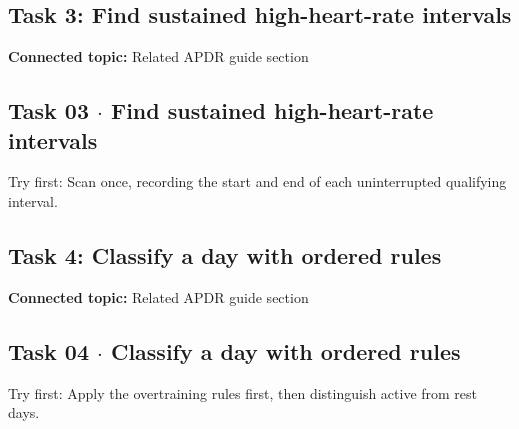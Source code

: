 \documentclass[11pt]{article}
\begin{document}
\begin{keepsection}
\section{Task 3: Find sustained high-heart-rate intervals}

\textbf{Connected topic:} Related APDR guide section

\begin{keepsection}
\subsection{Task 03 \ensuremath{\cdot} Find sustained high-heart-rate intervals}

Try first: Scan once, recording the start and end of each uninterrupted qualifying interval.

\end{keepsection}
\end{keepsection}

\begin{keepsection}
\section{Task 4: Classify a day with ordered rules}

\textbf{Connected topic:} Related APDR guide section

\begin{keepsection}
\subsection{Task 04 \ensuremath{\cdot} Classify a day with ordered rules}

Try first: Apply the overtraining rules first, then distinguish active from rest days.

\end{keepsection}
\end{keepsection}
\end{document}
